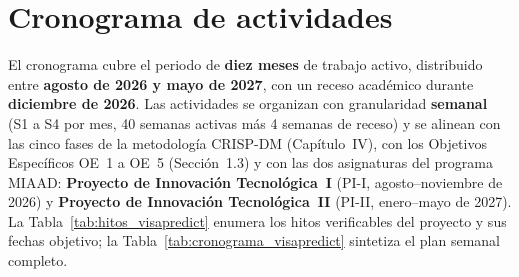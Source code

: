 \documentclass[12pt,letterpaper]{report}
\begin{document}
\chapter{Cronograma de actividades}

El cronograma cubre el periodo de \textbf{diez meses} de trabajo activo, distribuido entre \textbf{agosto de 2026 y mayo de 2027}, con un receso académico durante \textbf{diciembre de 2026}. Las actividades se organizan con granularidad \textbf{semanal} (S1 a S4 por mes, 40 semanas activas más 4 semanas de receso) y se alinean con las cinco fases de la metodología CRISP-DM (Capítulo~IV), con los Objetivos Específicos OE~1 a OE~5 (Sección~1.3) y con las dos asignaturas del programa MIAAD: \textbf{Proyecto de Innovación Tecnológica~I} (PI-I, agosto--noviembre de 2026) y \textbf{Proyecto de Innovación Tecnológica~II} (PI-II, enero--mayo de 2027). La Tabla~\ref{tab:hitos_visapredict} enumera los hitos verificables del proyecto y sus fechas objetivo; la Tabla~\ref{tab:cronograma_visapredict} sintetiza el plan semanal completo.
\end{document}
